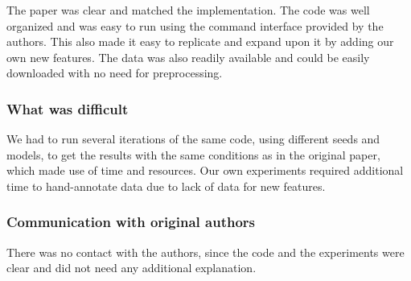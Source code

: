 The paper was clear and matched the implementation. The code was well organized and was easy to run using the command interface provided by the authors. This also made it easy to replicate and expand upon it by adding our own new features. The data was also readily available and could be easily downloaded with no need for preprocessing.

\subsubsection*{What was difficult}
 
We had to run several iterations of the same code, using different seeds and models, to get the results with the same conditions as in the original paper, which made use of time and resources. Our own experiments required additional time to hand-annotate data due to lack of data for new features.

\subsubsection*{Communication with original authors}
There was no contact with the authors, since the code and the experiments were clear and did not need any additional explanation.

